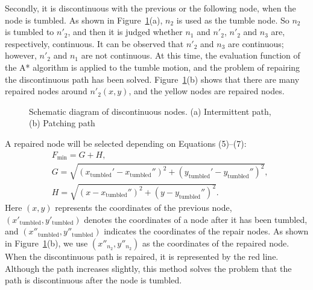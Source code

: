 \documentclass{PDS}%
\theoremstyle{definition}
\begin{document}
Secondly, it is discontinuous with the previous or the following node, when the node is
tumbled. As shown in Figure~\ref{fig:4}(a), $n_2$ is used as the tumble node. So $n_2$ is
tumbled to $n'_2$, and then it is judged whether $n_1$ and $n'_2$, $n'_2$ and $n_3$ are,
respectively, continuous. It can be observed that $n'_2$ and $n_3$ are continuous;
however, $n'_2$ and $n_1$ are not continuous. At this time, the evaluation function of
the A* algorithm is applied to the tumble motion, and the problem of repairing the
discontinuous path has been solved. Figure~\ref{fig:4}(b) shows that there are many
repaired nodes around $n'_2(x, y)$, and the yellow nodes are repaired nodes.

\begin{figure}[h!]
\caption{Schematic diagram of discontinuous nodes. (a) Intermittent path, (b) Patching path}
\label{fig:4}
\end{figure}

A repaired node will be selected depending on Equations (5)--(7):
\begin{align}
&F_{\min } = G + H, \label{equ:5}\\
&G = \sqrt {(x_{\text{tumbled}}' - x_{\text{tumbled}}'' )^2 + (y_{\text{tumbled}}' - y_{\text{tumbled}}'' )^2 }, \label{equ:6}\\
&H = \sqrt {(x - x_{\text{tumbled}}'' )^2 + (y - y_{\text{tumbled}}'' )^2}. \label{equ:7}
\end{align}
Here $(x, y)$ represents the coordinates of the previous node, $(x'_{\text{tumbled}}, y'_{\text{tumbled}})$ denotes the coordinates of a node after it has been tumbled, and
$(x''_{\text{tumbled}}, y''_{\text{tumbled}})$ indicates the coordinates of the repair
nodes. As shown in Figure~\ref{fig:4}(b), we use $(x''_{n_2}, y''_{n_2})$ as the
coordinates of the repaired node. When the discontinuous path is repaired, it is
represented by the red line. Although the path increases slightly, this method solves the
problem that the path is discontinuous after the node is tumbled.
\end{document}
